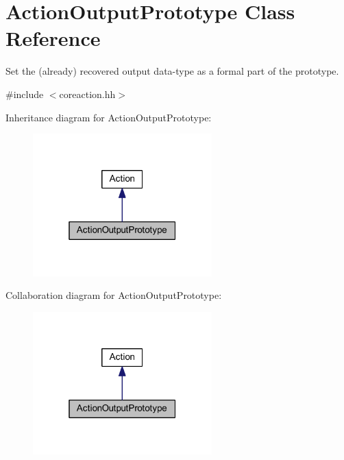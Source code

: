 \hypertarget{class_action_output_prototype}{}\section{Action\+Output\+Prototype Class Reference}
\label{class_action_output_prototype}


Set the (already) recovered output data-\/type as a formal part of the prototype.  




{\ttfamily \#include $<$coreaction.\+hh$>$}



Inheritance diagram for Action\+Output\+Prototype\+:
\nopagebreak
\begin{figure}[H]
\begin{center}
\leavevmode
\includegraphics[width=196pt]{class_action_output_prototype__inherit__graph}
\end{center}
\end{figure}


Collaboration diagram for Action\+Output\+Prototype\+:
\nopagebreak
\begin{figure}[H]
\begin{center}
\leavevmode
\includegraphics[width=196pt]{class_action_output_prototype__coll__graph}
\end{center}
\end{figure}
